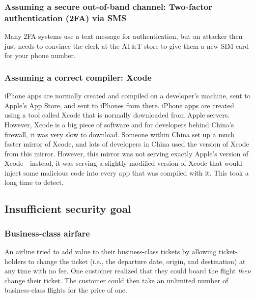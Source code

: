 \subsubsection{Assuming a secure out-of-band channel: Two-factor authentication (2FA) via SMS}
Many 2FA systems use a text message for authentication, but an attacker then
just needs to convince the clerk at the AT\&T store to give them a new SIM card for your phone number.

\subsubsection{Assuming a correct compiler: Xcode}\label{sec:intro:xcode}
iPhone apps are normally created and compiled on a developer's machine, sent to Apple's App Store, and sent to iPhones from there. iPhone apps are created using a tool called Xcode that is normally downloaded from Apple servers. However, Xcode is a big piece of software and for developers behind China's firewall, it was very slow to download. Someone within China set up a much faster mirror of Xcode, and lots of developers in China used the version of Xcode from this mirror. However, this mirror was not serving exactly Apple's version of Xcode---instead, it was serving a slightly modified version of Xcode that would inject some malicious code into every app that was compiled with it. This took a long time to detect.

\subsection{Insufficient security goal}
\subsubsection{Business-class airfare}
An airline tried to add value to their
business-class tickets by allowing ticket-holders to 
change the ticket (i.e., the departure date, origin, and destination)
at any time with no fee.
One customer realized that they could board the flight
\textit{then} change their ticket.
The customer could then take an unlimited number of
business-class flights for the price of one.


